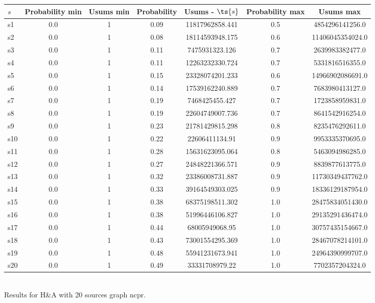 \documentclass{article}
\begin{document}
\noindent\begin{tabular}{|l|c|c|c|c|c|c|}
\hline
$s$& Probability min & Usums min & Probability & Usums - $\ts{s}$ & Probability max & Usums max\\
\hline
s1 &0.0 & 1 & 0.09 & 11817962858.441 & 0.5 & 4854296141256.0\\
\hline
s2 &0.0 & 1 & 0.08 & 18114593948.175 & 0.6 & 11406045354024.0\\
\hline
s3 &0.0 & 1 & 0.11 & 7475931323.126 & 0.7 & 2639983382477.0\\
\hline
s4 &0.0 & 1 & 0.11 & 12263232330.724 & 0.7 & 5331816516355.0\\
\hline
s5 &0.0 & 1 & 0.15 & 23328074201.233 & 0.6 & 14966902086691.0\\
\hline
s6 &0.0 & 1 & 0.14 & 17539162240.889 & 0.7 & 7683980413127.0\\
\hline
s7 &0.0 & 1 & 0.19 & 7468425455.427 & 0.7 & 1723858959831.0\\
\hline
s8 &0.0 & 1 & 0.19 & 22604749007.736 & 0.7 & 8641542916254.0\\
\hline
s9 &0.0 & 1 & 0.23 & 21781429815.298 & 0.8 & 8235476292611.0\\
\hline
s10 &0.0 & 1 & 0.22 & 22606411134.91 & 0.9 & 9953335370695.0\\
\hline
s11 &0.0 & 1 & 0.28 & 15631623095.064 & 0.8 & 5463094986285.0\\
\hline
s12 &0.0 & 1 & 0.27 & 24848221366.571 & 0.9 & 8839877613775.0\\
\hline
s13 &0.0 & 1 & 0.32 & 23386008731.887 & 0.9 & 11730349437762.0\\
\hline
s14 &0.0 & 1 & 0.33 & 39164549303.025 & 0.9 & 18336129187954.0\\
\hline
s15 &0.0 & 1 & 0.38 & 68375198511.302 & 1.0 & 28475834051430.0\\
\hline
s16 &0.0 & 1 & 0.38 & 51996446106.827 & 1.0 & 29135291436474.0\\
\hline
s17 &0.0 & 1 & 0.44 & 68005949068.95 & 1.0 & 30757435154667.0\\
\hline
s18 &0.0 & 1 & 0.43 & 73001554295.369 & 1.0 & 28467078214101.0\\
\hline
s19 &0.0 & 1 & 0.48 & 55941231673.941 & 1.0 & 24964390999707.0\\
\hline
s20 &0.0 & 1 & 0.49 & 33331708979.22 & 1.0 & 7702357204324.0\\
\hline
\end{tabular}\\

\noindent Results for H\&A with 20 sources graph ncpr.
\end{document}

